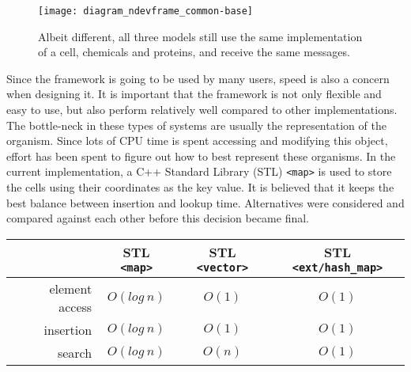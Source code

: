 \begin{figure}[!ht]
	\centering
	\texttt{[image: diagram\_ndevframe\_common-base]}
	\caption{Albeit different, all three models still use the same implementation of a cell, chemicals and proteins, and receive the same messages.}
	\label{fig:diagram_ndevframe_common-base}
\end{figure}

Since the framework is going to be used by many users, speed is also a concern when designing it. It is important that the framework is not only flexible and easy to use, but also perform relatively well compared to other implementations. The bottle-neck in these types of systems are usually the representation of the organism. Since lots of CPU time is spent accessing and modifying this object, effort has been spent to figure out how to best represent these organisms. In the current implementation, a C++ Standard Library (STL) \texttt{<map>} is used to store the cells using their coordinates as the key value. It is believed that it keeps the best balance between insertion and lookup time. Alternatives were considered and compared against each other before this decision became final.

\begin{center}
	\begin{tabular}{ r | c | c | c }
		~ & STL \texttt{<map>} & STL \texttt{<vector>} & STL \texttt{<ext/hash\_map>} \\
		\hline
		element access & $O(log~n)$ & $O(1)$ & $O(1)$ \\
		\hline
		insertion & $O(log~n)$ & $O(1)$ & $O(1)$ \\
		\hline
		search & $O(log~n)$ & $O(n)$ & $O(1)$ \\
	\end{tabular}
	\label{tbl:speed}
\end{center}

